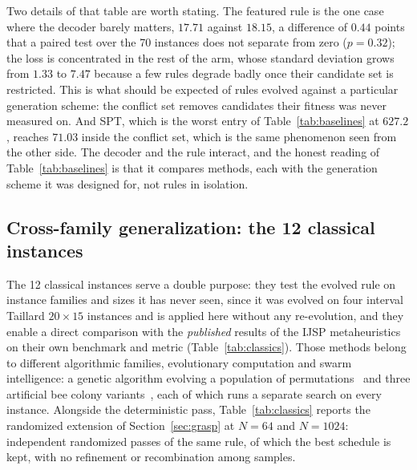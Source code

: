 \documentclass[review,authoryear,11pt]{elsarticle}
\newcommand{\rev}[1]{\textcolor{revcolor}{#1}}
\begin{document}
\rev{Two details of that table are worth stating. The featured rule is
the one case where the decoder barely matters, $17.71$ against $18.15$,
a difference of $0.44$ points that a paired test over the 70 instances
does not separate from zero ($p = 0.32$); the loss is concentrated in
the rest of the arm, whose standard deviation grows from $1.33$ to
$7.47$ because a few rules degrade badly once their candidate set is
restricted. This is what should be expected of rules evolved against a
particular generation scheme: the conflict set removes candidates their
fitness was never measured on. And SPT, which is the worst entry of
Table~\ref{tab:baselines} at $627.2$, reaches $71.03$ inside the
conflict set, which is the same phenomenon seen from the other side.
The decoder and the rule interact, and the honest reading of
Table~\ref{tab:baselines} is that it compares methods, each with the
generation scheme it was designed for, not rules in isolation.}

\subsection{Cross-family generalization: the 12 classical instances}
\label{sec:classics}
The 12 classical instances serve a double purpose: they test the evolved
rule on instance families and sizes it has never seen, since it was
evolved on four interval Taillard $20{\times}15$ instances and is
applied here without any re-evolution, and they enable a direct
comparison with the \emph{published} results of the IJSP metaheuristics
on their own benchmark and metric (Table~\ref{tab:classics}). Those
methods belong to different algorithmic families, evolutionary
computation and swarm intelligence: a genetic algorithm
evolving a population of permutations~\citep{DiazGA2020} and three
artificial bee colony variants~\citep{DiazFEABC2023,DiazICAE2023}, each
of which runs a separate search on every instance. Alongside the
deterministic pass, Table~\ref{tab:classics} reports the randomized
extension of Section~\ref{sec:grasp} at $N = 64$ and $N = 1024$:
independent randomized passes of the same rule, of which the best
schedule is kept, with no refinement or recombination among samples.
\end{document}
